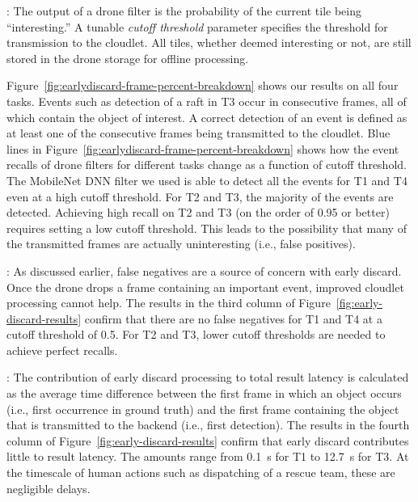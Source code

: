 : The output of a drone filter is the
probability of the current tile being ``interesting.''  A tunable {\em cutoff
threshold} parameter specifies the threshold for transmission to the cloudlet.
All tiles, whether deemed interesting or not, are still stored in the drone
storage for offline processing.

Figure~\ref{fig:earlydiscard-frame-percent-breakdown} shows our results on all
four tasks. Events such as detection of a raft in T3 occur in consecutive
frames, all of which contain the object of interest. A correct detection of an
event is defined as at least one of the consecutive frames being transmitted to
the cloudlet.  Blue lines in
Figure~\ref{fig:earlydiscard-frame-percent-breakdown} shows how the event
recalls of drone filters for different tasks change as a function of cutoff
threshold. The MobileNet DNN filter we used is able to detect all the events for
T1 and T4 even at a high cutoff threshold. For T2 and T3, the majority of the
events are detected. Achieving high recall on T2 and T3 (on the order of 0.95 or
better) requires setting a low cutoff threshold.  This leads to the possibility
that many of the transmitted frames are actually uninteresting (i.e., false
positives).

: As discussed earlier, false negatives are
a source of concern with early discard.  Once the drone drops a frame
containing an important event, improved cloudlet processing cannot help. The
results in the third column of Figure~\ref{fig:early-discard-results} confirm
that there are no false negatives for T1 and T4 at a cutoff threshold of 0.5.
For T2 and T3, lower cutoff thresholds are needed to achieve perfect recalls.

:
The contribution of early discard processing to total result latency
is calculated as the average time difference between the first frame
in which an object occurs (i.e., first occurrence in ground truth) and
the first frame containing the object that is transmitted to the
backend (i.e., first detection).  The results in the fourth column of
Figure~\ref{fig:early-discard-results} confirm that early discard
contributes little to result latency.  The amounts range from 0.1~s
for T1 to 12.7~s for T3.  At the timescale of human actions
such as dispatching of a rescue team, these are negligible delays.

